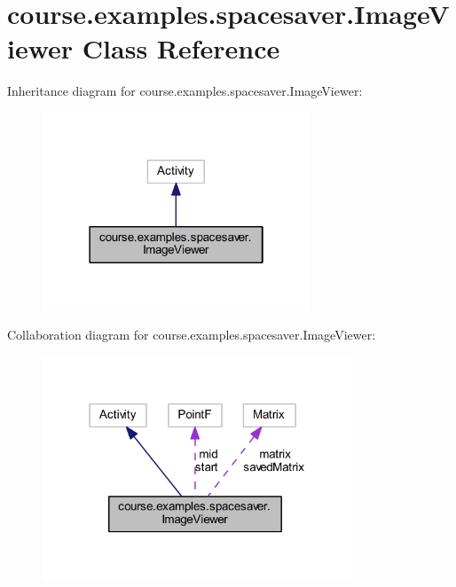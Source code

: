 \hypertarget{classcourse_1_1examples_1_1spacesaver_1_1_image_viewer}{}\section{course.\+examples.\+spacesaver.\+Image\+Viewer Class Reference}
\label{classcourse_1_1examples_1_1spacesaver_1_1_image_viewer}


Inheritance diagram for course.\+examples.\+spacesaver.\+Image\+Viewer\+:
\nopagebreak
\begin{figure}[H]
\begin{center}
\leavevmode
\includegraphics[width=226pt]{classcourse_1_1examples_1_1spacesaver_1_1_image_viewer__inherit__graph}
\end{center}
\end{figure}


Collaboration diagram for course.\+examples.\+spacesaver.\+Image\+Viewer\+:
\nopagebreak
\begin{figure}[H]
\begin{center}
\leavevmode
\includegraphics[width=262pt]{classcourse_1_1examples_1_1spacesaver_1_1_image_viewer__coll__graph}
\end{center}
\end{figure}
